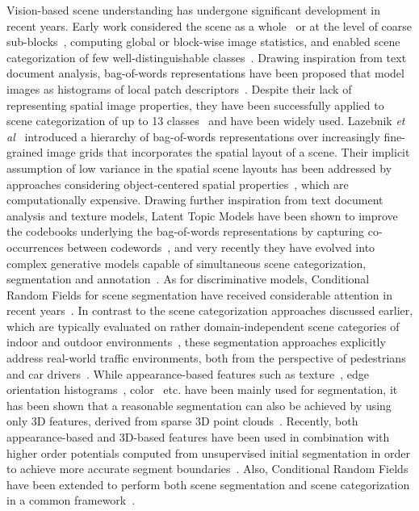\documentclass{bmvc2k}
\def\etal{\emph{et al}\bmvaOneDot}
\begin{document}
Vision-based scene understanding has undergone significant development in recent years. Early work considered the scene as a whole~\cite{global} or at the level of coarse sub-blocks~\cite{sub_blocks}, computing global or block-wise image statistics, and enabled scene categorization of few well-distinguishable classes~\cite{few1, few2, few3}. Drawing inspiration from text document analysis, bag-of-words representations have been proposed that model images as histograms of local patch descriptors~\cite{bag_of_words}. Despite their lack of representing spatial image properties, they have been successfully applied to scene categorization of up to 13 classes~\cite{feifei05} and have been widely used. Lazebnik \etal~\cite{lazebnik06} introduced a hierarchy of bag-of-words representations over increasingly fine-grained image grids that incorporates the spatial layout of a scene. Their implicit assumption of low variance in the spatial scene layouts has been addressed by approaches considering object-centered spatial properties~\cite{ommer07}, which are computationally expensive. Drawing further inspiration from text document analysis and texture models, Latent Topic Models have been shown to improve the codebooks underlying the bag-of-words representations by capturing co-occurrences between codewords~\cite{quelhas05, feifei05, bosch06}, and very recently they have evolved into complex generative models capable of simultaneous scene categorization, segmentation and annotation~\cite{cao07, wang09, li09}. As for discriminative models, Conditional Random Fields for scene segmentation have received considerable attention in recent years~\cite{crfs}. In contrast to the scene categorization approaches discussed earlier, which are typically evaluated on rather domain-independent scene categories of indoor and outdoor environments~\cite{generative_dataset1, generative_dataset2, generative_dataset3}, these segmentation approaches explicitly address real-world traffic environments, both from the perspective of pedestrians and car drivers~\cite{discriminative_dataset1, discriminative_dataset2, discriminative_dataset3}. While appearance-based features such as texture~\cite{shotton06}, edge orientation histograms~\cite{dalal05}, color~\cite{color_seg} etc. have been mainly used for segmentation, it has been shown that a reasonable segmentation can also be achieved by using only 3D features, derived from sparse 3D point clouds~\cite{brostow08}. Recently, both appearance-based and 3D-based features have been used in combination with higher order potentials computed from unsupervised initial segmentation in order to achieve more accurate segment boundaries~\cite{sturgess09}. Also, Conditional Random Fields have been extended to perform both scene segmentation and scene categorization in a common framework~\cite{wang08}. 
\end{document}
